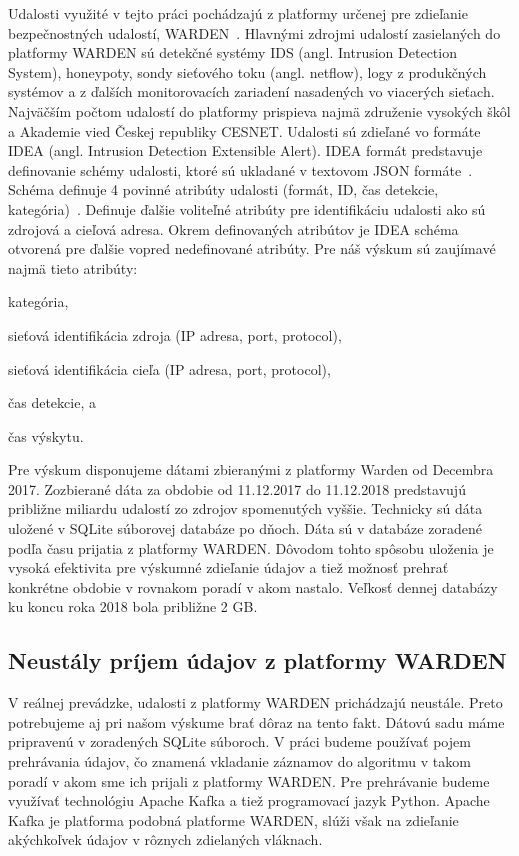 \documentclass[thesismargins, thesislinespacing, openright, upjsfrontpage, combineabstracts]{rnthesis}
\begin{document}
Udalosti využité v tejto práci pochádzajú z platformy určenej pre zdieľanie bezpečnostných udalostí, WARDEN~\cite{kacha2015warden}. Hlavnými zdrojmi udalostí zasielaných do platformy WARDEN sú detekčné systémy IDS (angl. Intrusion Detection System), honeypoty, sondy sieťového toku (angl. netflow), logy z produkčných systémov a z ďalších monitorovacích zariadení nasadených vo viacerých sieťach. Najväčším počtom udalostí do platformy prispieva najmä združenie vysokých škôl a Akademie vied Českej republiky CESNET. Udalosti sú zdieľané vo formáte IDEA (angl. Intrusion Detection Extensible Alert). IDEA formát predstavuje definovanie schémy udalosti, ktoré sú ukladané v textovom JSON formáte~\cite{pezoa2016foundations}. Schéma definuje 4 povinné atribúty udalosti (formát, ID, čas detekcie, kategória)~\cite{kacha2014idea}. Definuje ďalšie voliteľné atribúty pre identifikáciu udalosti ako sú zdrojová a cieľová adresa. Okrem definovaných atribútov je IDEA schéma otvorená pre ďalšie vopred nedefinované atribúty. Pre náš výskum sú zaujímavé najmä tieto atribúty:

\begin{compactenum}
\item kategória, 
\item sieťová identifikácia zdroja (IP adresa, port, protocol), 
\item sieťová identifikácia cieľa (IP adresa, port, protocol), 
\item čas detekcie, a
\item čas výskytu.
\end{compactenum}

Pre výskum disponujeme dátami zbieranými z platformy Warden od Decembra 2017. Zozbierané dáta za obdobie od 11.12.2017 do 11.12.2018 predstavujú približne miliardu udalostí zo zdrojov spomenutých vyššie. Technicky sú dáta uložené v SQLite súborovej databáze po dňoch. Dáta sú v databáze zoradené podľa času prijatia z platformy WARDEN. Dôvodom tohto spôsobu uloženia je vysoká efektivita pre výskumné zdieľanie údajov a tiež možnosť prehrať konkrétne obdobie v rovnakom poradí v akom nastalo. Veľkosť dennej databázy ku koncu roka 2018 bola približne 2 GB.

\subsection{Neustály príjem údajov z platformy WARDEN}

V reálnej prevádzke, udalosti z platformy WARDEN prichádzajú neustále. Preto potrebujeme aj pri našom výskume brať dôraz na tento fakt. Dátovú sadu máme pripravenú v zoradených SQLite súboroch. V práci budeme používať pojem prehrávania údajov, čo znamená vkladanie záznamov do algoritmu v takom poradí v akom sme ich prijali z platformy WARDEN. Pre prehrávanie budeme využívať technológiu Apache Kafka a tiež programovací jazyk Python. Apache Kafka je platforma podobná platforme WARDEN, slúži však na zdieľanie akýchkoľvek údajov v rôznych zdielaných vláknach. 
\end{document}
